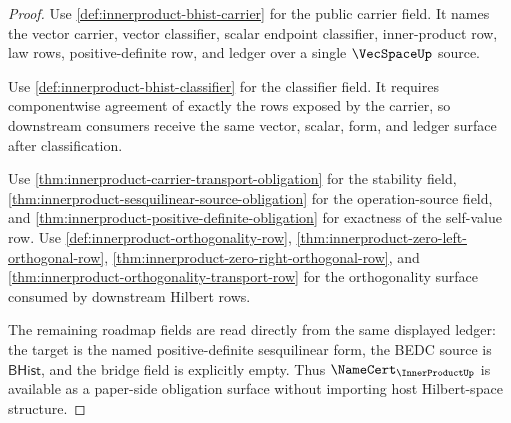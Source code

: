 \begin{proof}
Use \autoref{def:innerproduct-bhist-carrier} for the public carrier field. It
names the vector carrier, vector classifier, scalar endpoint classifier,
inner-product row, law rows, positive-definite row, and ledger over a single
$\VecSpaceUp$ source.

Use \autoref{def:innerproduct-bhist-classifier} for the classifier field. It
requires componentwise agreement of exactly the rows exposed by the carrier,
so downstream consumers receive the same vector, scalar, form, and ledger
surface after classification.

Use \autoref{thm:innerproduct-carrier-transport-obligation} for the stability
field, \autoref{thm:innerproduct-sesquilinear-source-obligation} for the
operation-source field, and
\autoref{thm:innerproduct-positive-definite-obligation} for exactness of the
self-value row. Use
\autoref{def:innerproduct-orthogonality-row},
\autoref{thm:innerproduct-zero-left-orthogonal-row},
\autoref{thm:innerproduct-zero-right-orthogonal-row}, and
\autoref{thm:innerproduct-orthogonality-transport-row} for the orthogonality
surface consumed by downstream Hilbert rows.

The remaining roadmap fields are read directly from the same displayed
ledger: the target is the named positive-definite sesquilinear form, the BEDC
source is $\mathsf{BHist}$, and the bridge field is explicitly empty. Thus
$\NameCert_{\InnerProductUp}$ is available as a paper-side obligation surface
without importing host Hilbert-space structure.
\end{proof}

